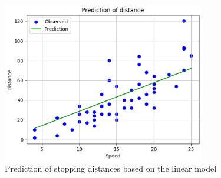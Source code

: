 \begin{figure}[htbp]
    \centering
    \includegraphics[width=\linewidth, height= 7cm]{plots/output_multivar_8.png}
    \caption{Prediction of stopping distances based on the linear model}
    \label{fig:my_label}
\end{figure}
